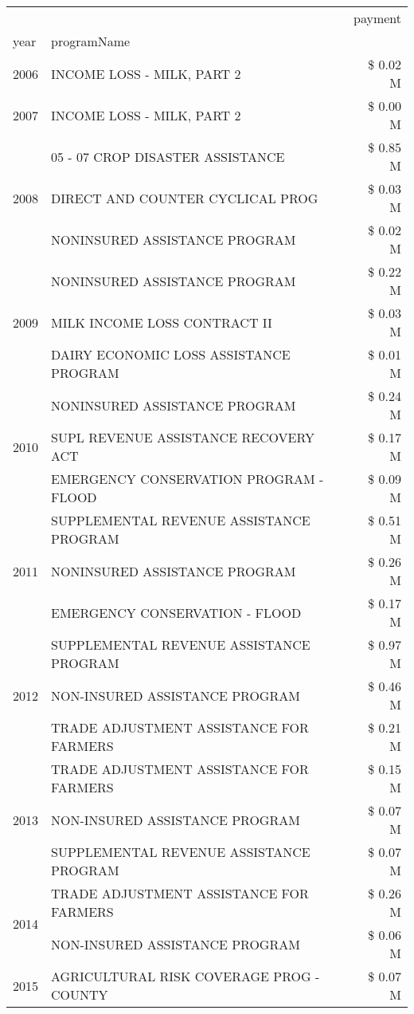 \begin{tabular}{llr}
\toprule
 &  & payment \\
year & programName &  \\
\midrule
2006 & INCOME LOSS - MILK, PART 2 & \$ 0.02 M \\
\cline{1-3}
2007 & INCOME LOSS - MILK, PART 2 & \$ 0.00 M \\
\cline{1-3}
\multirow[t]{3}{*}{2008} & 05 - 07 CROP DISASTER ASSISTANCE & \$ 0.85 M \\
 & DIRECT AND COUNTER CYCLICAL PROG & \$ 0.03 M \\
 & NONINSURED ASSISTANCE PROGRAM & \$ 0.02 M \\
\cline{1-3}
\multirow[t]{3}{*}{2009} & NONINSURED ASSISTANCE PROGRAM & \$ 0.22 M \\
 & MILK INCOME LOSS CONTRACT II & \$ 0.03 M \\
 & DAIRY ECONOMIC LOSS ASSISTANCE PROGRAM & \$ 0.01 M \\
\cline{1-3}
\multirow[t]{3}{*}{2010} & NONINSURED ASSISTANCE PROGRAM & \$ 0.24 M \\
 & SUPL REVENUE ASSISTANCE RECOVERY ACT & \$ 0.17 M \\
 & EMERGENCY CONSERVATION PROGRAM - FLOOD & \$ 0.09 M \\
\cline{1-3}
\multirow[t]{3}{*}{2011} & SUPPLEMENTAL REVENUE ASSISTANCE PROGRAM & \$ 0.51 M \\
 & NONINSURED ASSISTANCE PROGRAM & \$ 0.26 M \\
 & EMERGENCY CONSERVATION - FLOOD & \$ 0.17 M \\
\cline{1-3}
\multirow[t]{3}{*}{2012} & SUPPLEMENTAL REVENUE ASSISTANCE PROGRAM & \$ 0.97 M \\
 & NON-INSURED ASSISTANCE PROGRAM & \$ 0.46 M \\
 & TRADE ADJUSTMENT ASSISTANCE FOR FARMERS & \$ 0.21 M \\
\cline{1-3}
\multirow[t]{3}{*}{2013} & TRADE ADJUSTMENT ASSISTANCE FOR FARMERS & \$ 0.15 M \\
 & NON-INSURED ASSISTANCE PROGRAM & \$ 0.07 M \\
 & SUPPLEMENTAL REVENUE ASSISTANCE PROGRAM & \$ 0.07 M \\
\cline{1-3}
\multirow[t]{2}{*}{2014} & TRADE ADJUSTMENT ASSISTANCE FOR FARMERS & \$ 0.26 M \\
 & NON-INSURED ASSISTANCE PROGRAM & \$ 0.06 M \\
\cline{1-3}
\multirow[t]{3}{*}{2015} & AGRICULTURAL RISK COVERAGE PROG - COUNTY & \$ 0.07 M \\

\end{tabular}
